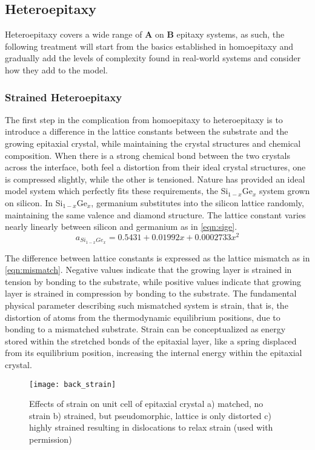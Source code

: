 \subsection{Heteroepitaxy}
Heteroepitaxy covers a wide range of \textbf{A} on \textbf{B} epitaxy systems, as such, the following treatment will start from the basics established in homoepitaxy and gradually add the levels of complexity found in real-world systems and consider how they add to the model.

\subsubsection{Strained Heteroepitaxy}
The first step in the complication from homoepitaxy to heteroepitaxy is to introduce a difference in the lattice constants between the substrate and the growing epitaxial crystal, while maintaining the crystal structures and chemical composition. When there is a strong chemical bond between the two crystals across the interface, both feel a distortion from their ideal crystal structures, one is compressed slightly, while the other is tensioned\cite{Dunstan1997}. Nature has provided an ideal model system which perfectly fits these requirements, the Si$_{1-x}$Ge$_x$ system grown on silicon\cite{Paul2004}. In Si$_{1-x}$Ge$_x$, germanium substitutes into the silicon lattice randomly, maintaining the same valence and diamond structure. The lattice constant varies nearly linearly between silicon and germanium as in \cref{eqn:sige}.
\begin{equation}
a_{Si_{1-x}Ge_x} = 0.5431 + 0.01992x + 0.0002733x^2 \label{eqn:sige}
\end{equation}

The difference between lattice constants is expressed as the lattice mismatch as in \cref{eqn:mismatch}. Negative values indicate that the growing layer is strained in tension by bonding to the substrate, while positive values indicate that growing layer is strained in compression by bonding to the substrate. The fundamental physical parameter describing such mismatched system is strain, that is, the distortion of atoms from the thermodynamic equilibrium positions, due to bonding to a mismatched substrate. Strain can be conceptualized as energy stored within the stretched bonds of the epitaxial layer, like a spring displaced from its equilibrium position, increasing the internal energy within the epitaxial crystal.
\begin{figure}
    \centering
    \texttt{[image: back\_strain]}
    \caption[Unit cell strain visualization]{\label{fig:back_strain}Effects of strain on unit cell of epitaxial crystal a) matched, no strain b) strained, but pseudomorphic, lattice is only distorted c) highly strained resulting in dislocations to relax strain\cite{ohring2001materials} (used with permission)}
\end{figure}


